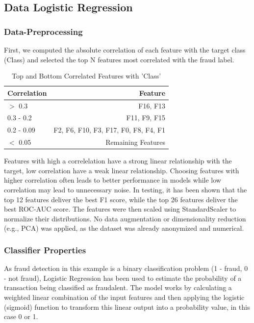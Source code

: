 \documentclass[a4, 10 pt, conference]{ieeeconf}  %
\begin{document}
\subsection{Data Logistic Regression}
\subsubsection{Data-Preprocessing}
\label{subsubsection:data-processing}
First, we computed the absolute correlation of each feature with the target class (Class) and selected the top N features most correlated with the fraud label. 

\begin{table}[h!]
\begin{tabular}{l r}
\hline
\textbf{Correlation} & \textbf{Feature} \\
\hline
$>$ 0.3 		& F16, F13 \\
0.3 - 0.2  	& F11, F9, F15 \\
0.2 - 0.09 	& F2, F6, F10, F3, F17, F0, F8, F4, F1 \\
$<$ 0.05 	& Remaining Features \\
\hline
\end{tabular}
\centering
\caption{Top and Bottom Correlated Features with 'Class'}
\end{table}

Features with high a correlelation have a strong linear relationship with the target, low correlation have a weak linear relationship. Choosing features with higher correlation often leads to better performance in models while low correlation may lead to unnecessary noise. In testing, it has been shown that the top 12 features deliver the best F1 score, while the top 26 features deliver the best ROC-AUC score.
The features were then scaled using StandardScaler to normalize their distributions. No data augmentation or dimensionality reduction (e.g., PCA) was applied, as the dataset was already anonymized and numerical.

\subsubsection{Classifier Properties}
\label{subsubsection:classifier-properties}
As fraud detection in this example is a binary classification problem (1 - fraud, 0 - not fraud), Logistic Regression has been used to estimate the probability of a transaction being classified as fraudalent. The model works by calculating a weighted linear combination of the input features and then applying the logistic (sigmoid) function to transform this linear output into a probability value, in this case 0 or 1.
\end{document}
